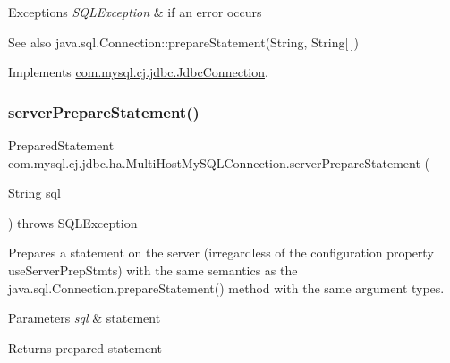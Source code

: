 \begin{DoxyExceptions}{Exceptions}
{\em S\+Q\+L\+Exception} & if an error occurs\\
\hline
\end{DoxyExceptions}
\begin{DoxySeeAlso}{See also}
java.\+sql.\+Connection\+::prepare\+Statement(\+String, String\mbox{[}$\,$\mbox{]}) 
\end{DoxySeeAlso}


Implements \mbox{\hyperlink{interfacecom_1_1mysql_1_1cj_1_1jdbc_1_1_jdbc_connection_aa15ffc32d47d1950257c4720802694bf}{com.\+mysql.\+cj.\+jdbc.\+Jdbc\+Connection}}.

\mbox{\label{classcom_1_1mysql_1_1cj_1_1jdbc_1_1ha_1_1_multi_host_my_s_q_l_connection_a7db176300b273436df94f2cc48e986af}} 
\subsubsection{\texorpdfstring{server\+Prepare\+Statement()}{serverPrepareStatement()}\hspace{0.1cm}{\footnotesize\ttfamily [6/6]}}
{\footnotesize\ttfamily Prepared\+Statement com.\+mysql.\+cj.\+jdbc.\+ha.\+Multi\+Host\+My\+S\+Q\+L\+Connection.\+server\+Prepare\+Statement (\begin{DoxyParamCaption}\item[{String}]{sql }\end{DoxyParamCaption}) throws S\+Q\+L\+Exception}

Prepares a statement on the server (irregardless of the configuration property \textquotesingle{}use\+Server\+Prep\+Stmts\textquotesingle{}) with the same semantics as the java.\+sql.\+Connection.\+prepare\+Statement() method with the same argument types.


\begin{DoxyParams}{Parameters}
{\em sql} & statement \\
\hline
\end{DoxyParams}
\begin{DoxyReturn}{Returns}
prepared statement 
\end{DoxyReturn}

